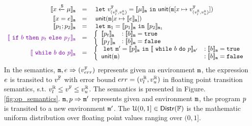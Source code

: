 \documentclass[a4paper,11pt]{article}
\begin{document}
\[
\begin{array}{rcl}
	\sem{\varx \samplel \edistr}_{\trsmem}
	& = & 
	\elet \fval_{(\rval_{l}, \rval_{u})} = \sem{\edistr}_{\trsmem}
	\ein 
	\unit{\trsmem[\varx \mapsto \fval_{(\rval_{l}, \rval_{u})}]}
	\\
	\sem{\varx = \expr}_{\trsmem}
	& = &  
	~\unit{\trsmem[\varx \mapsto \sem{\expr}_{\trsmem}]}
	\\
	\sem{\prog_1; \prog_2}_{\trsmem}
	& = &  \elet  \trsmem_1 = 
	\sem{\prog_1}_{\trsmem} \ein
	\sem{\prog_2}_{\trsmem_1} 
	\\
	\extend{\sem{\eif \bexpr \ethen \prog_t \eelse \prog_f}_{\trsmem}}
	& = & 
	\left\{
	\begin{array}{ll}
	\sem{\prog_t}_{\trsmem} & : \sem{\bexpr}_{\trsmem} = \etrue \\
	\sem{\prog_f}_{\trsmem} & : \sem{\bexpr}_{\trsmem} = \efalse \\
	\end{array}
	\right .
	\\
	\extend{\sem{\ewhile \bexpr \edo \prog}_{\trsmem}}
	& = &  
	\left\{
	\begin{array}{ll}
	\elet \trsmem' = \sem{\prog}_{\trsmem} \ein 
	\sem{\ewhile \bexpr \edo \prog}_{\trsmem'}
	  & : \sem{\bexpr}_{\trsmem} = \etrue \\
	\unit \trsmem & : \sem{\bexpr}_{\trsmem} = \efalse \\
	\end{array}
	\right .
\end{array}
\]
%
In the semantics, 
%
$\mathtt{m}, e \Rightarrow (v^{\mathbb{F}}_{err})$ represents given an environment
%
$\mathtt{m}$, the expression $e$
%
is transited to $v^{\mathbb{F}}$ with error bound $err = (v^{\mathbb{R}}_{l}, v^{\mathbb{R}}_{u})$
in floating point transition semantics,
%
s.t. $v^{\mathbb{R}}_{l} \leq v^{\mathbb{F}} \leq v^{\mathbb{R}}_{u}$. The semantics is presented in Figure. \ref{fig:op_semantics}.
%
$\mathtt{m}, p \Rightarrow \mathtt{m}'$ represents given and environment $\mathtt{m}$,
%
the program $p$ is transited to a new environment $\mathtt{m}'$.
%
The $\mathcal{U}(0, 1] \in \mathsf{Distr}(\mathbb{F})$ is the mathematic uniform distribution over floating point values ranging over $(0, 1]$.
%
%
\end{document}
